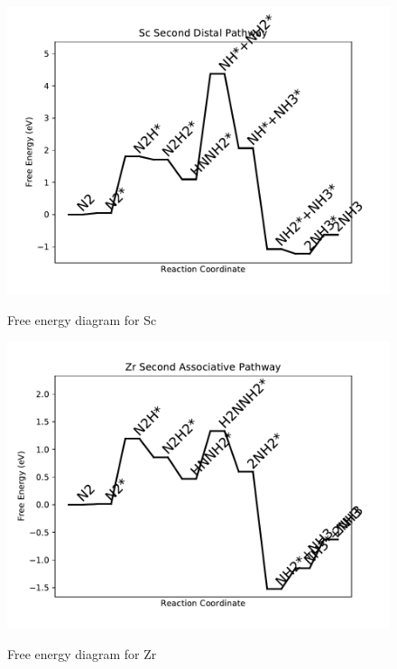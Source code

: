\documentclass{article}
\begin{document}
\newpage
\begin{figure}
\includegraphics[width=1\linewidth]{data/plots/Sc_distal_2.pdf}
\label{fig:Sc_distal_2}
\caption{Free energy diagram for Sc}
\end{figure}

\begin{figure}
\includegraphics[width=1\linewidth]{data/plots/Zr_associative_2.pdf}
\label{fig:Zr_associative_2}
\caption{Free energy diagram for Zr}
\end{figure}
\end{document}
